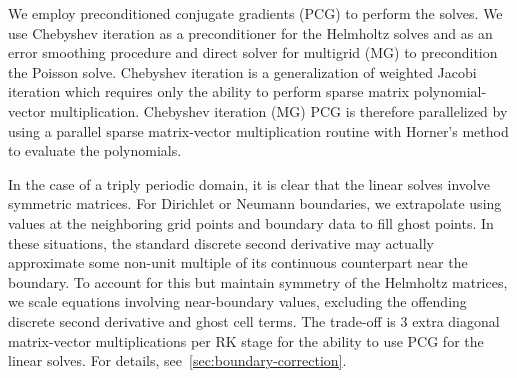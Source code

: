 We employ preconditioned conjugate gradients (PCG) to perform the solves. We use
Chebyshev iteration as a preconditioner for the Helmholtz solves and as an error
smoothing procedure and direct solver for multigrid (MG) to precondition the Poisson
solve. Chebyshev iteration is a generalization of weighted Jacobi iteration which
requires only the ability to perform sparse matrix polynomial-vector multiplication.
Chebyshev iteration (MG) PCG is therefore parallelized by using a parallel sparse
matrix-vector multiplication routine with Horner's method to evaluate the polynomials.

In the case of a triply periodic domain, it is clear that the linear solves involve
symmetric matrices. For Dirichlet or Neumann boundaries, we extrapolate using values at
the neighboring grid points and boundary data to fill ghost points. In these situations,
the standard discrete second derivative may actually approximate some non-unit multiple
of its continuous counterpart near the boundary. To account for this but maintain
symmetry of the Helmholtz matrices, we scale equations involving near-boundary values,
excluding the offending discrete second derivative and ghost cell terms. The trade-off is
3 extra diagonal matrix-vector multiplications per RK stage for the ability to use PCG
for the linear solves. For details, see~\ref{sec:boundary-correction}.

